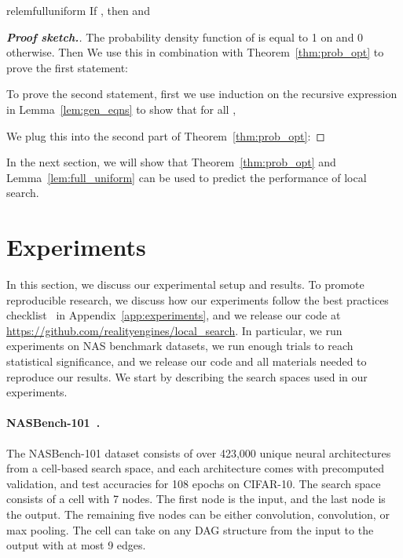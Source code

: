\documentclass[11pt]{article}
\let\citep\cite
\numberwithin{equation}{section}
\numberwithin{figure}{section}
\theoremstyle{plain}
\theoremstyle{definition}
\begin{document}
\begin{restatable}{relem}{fulluniform}\label{lem:full_uniform}
If ,
then  and

\end{restatable}

\begin{proof}[\textbf{Proof sketch.}]
The probability density function of  is equal to 1 on  and 0 otherwise.
Then 
We use this in combination with Theorem~\ref{thm:prob_opt} to prove the first statement:


To prove the second statement, first
we use induction on the recursive expression in Lemma~\ref{lem:gen_eqns}
to show that for all , 

We plug this into the second part of Theorem~\ref{thm:prob_opt}:

\end{proof}

In the next section, we will show that Theorem~\ref{thm:prob_opt} and 
Lemma~\ref{lem:full_uniform} can be used
to predict the performance of local search.




 
\section{Experiments} \label{sec:experiments}

In this section, we discuss our experimental setup and results.
To promote reproducible research,
we discuss how our experiments follow the best practices 
checklist~\citep{lindauer2019best} in Appendix~\ref{app:experiments},
and we release our code at \url{https://github.com/realityengines/local_search}.
In particular, we run experiments on NAS benchmark datasets, 
we run enough trials to reach statistical significance, and we release our code
and all materials needed to reproduce our results.
We start by describing the search spaces used in our experiments.


\paragraph{NASBench-101~\citep{nasbench}.}
The NASBench-101 dataset consists of over 423,000 
unique neural architectures from a cell-based search space,
and each architecture comes with precomputed validation, 
and test accuracies for 108 epochs on CIFAR-10. 
The search space consists of a cell with 7 nodes. 
The first node is the input, and the last node is the output. 
The remaining five nodes can be either  convolution, 
 convolution, or  max pooling.
The cell can take on any DAG structure from the input to the output with at most 9 edges.
\end{document}
